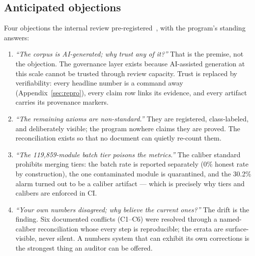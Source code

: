 \subsection{Anticipated objections}
\label{sec:objections}
Four objections the internal review pre-registered~\cite{sylvad1review2026},
with the program's standing answers:

\begin{enumerate}
\item \emph{``The corpus is AI-generated; why trust any of it?''}
That is the premise, not the objection. The governance layer
exists because AI-assisted generation at this scale cannot be
trusted through review capacity. Trust is replaced by
verifiability: every headline number is a command away
(Appendix~\ref{sec:repro}), every claim row links its evidence,
and every artifact carries its provenance markers.
\item \emph{``The remaining axioms are non-standard.''} They are
registered, class-labeled, and deliberately visible; the program
nowhere claims they are proved. The reconciliation exists so that
no document can quietly re-count them.
\item \emph{``The 119{,}859-module batch tier poisons the
metrics.''} The caliber standard prohibits merging tiers: the
batch rate is reported separately (0\% honest rate by
construction), the one contaminated module is quarantined, and
the 30.2\% alarm turned out to be a caliber artifact --- which is
precisely why tiers and calibers are enforced in CI.
\item \emph{``Your own numbers disagreed; why believe the current
ones?''} The drift is the finding. Six documented conflicts
(C1--C6) were resolved through a named-caliber reconciliation
whose every step is reproducible; the errata are surface-visible,
never silent. A numbers system that can exhibit its own
corrections is the strongest thing an auditor can be offered.
\end{enumerate}


